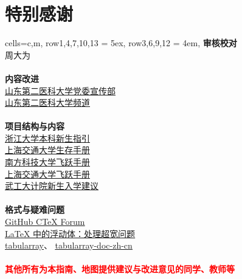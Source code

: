 \chapter*{特别感谢}
\vspace{1ex}
\begin{tblr}[
    long,
    theme=no-caption
    ]{
    cells={c,m},
    row{1,4,7,10,13} = {5ex},
    row{3,6,9,12} = {4em},}
    {\large\textbf{审核校对}}                                                             \\
    {周大为}                                                                              \\
    \\
    {\large\textbf{内容改进}}                                                             \\
    {
    \uline{\href{https://xchb.sdsmu.edu.cn/}{山东第二医科大学党委宣传部}}                 \\
    \uline{\href{https://pd.qq.com/s/7mekdr5ve}{山东第二医科大学频道}}
    }                                                                                     \\
    \\
    {\large\textbf{项目结构与内容}}                                                       \\
    {
    \uline{\href{https://zjuers.com/welcome/}{浙江大学本科新生指引}}                      \\
    \uline{\href{https://survivesjtu.gitbook.io/survivesjtumanual}{上海交通大学生存手册}} \\
    \uline{\href{https://sustech-application.com/}{南方科技大学飞跃手册}}                 \\
    \uline{\href{https://survivesjtu.github.io/SJTU-Application/}{上海交通大学飞跃手册}}  \\
    \uline{\href{https://gitee.com/hanyaner/witjij}{武工大计院新生入学建议}}
    }                                                                                     \\
    \\
    {\large\textbf{格式与疑难问题}}                                                       \\
    {
    \uline{\href{https://github.com/CTeX-org/forum/issues}{GitHub CTeX Forum}}            \\
    \uline{\href{https://liam.page/2017/03/22/floats-in-LaTeX-handle-overfull-floats/}{%
    LaTeX 中的浮动体：处理超宽问题}}                                                      \\
    \uline{\href{https://github.com/lvjr/tabularray}{tabularray}}、%
    \uline{\href{https://gitee.com/nwafu_nan/tabularray-doc-zh-cn}{tabularray-doc-zh-cn}}
    }                                                                                     \\
    \\
    {\large\textbf{\textcolor{red}{其他所有为本指南、地图提供建议与改进意见的同学、教师等}}}
\end{tblr}
